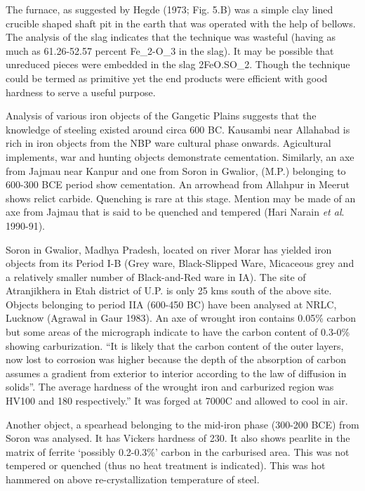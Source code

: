 The furnace, as suggested by Hegde (1973; Fig. 5.B) was a simple clay lined crucible shaped shaft pit in the earth that was operated with the help of bellows. The analysis of the slag indicates that the technique was wasteful (having as much as 61.26-52.57 percent Fe_2-O_3 in the slag). It may be possible that unreduced pieces were embedded in the slag 2FeO.SO_2. Though the technique could be termed as primitive yet the end products were efficient with good hardness to serve a useful purpose.

Analysis of various iron objects of the Gangetic Plains suggests that the knowledge of steeling existed around circa 600 BC. Kausambi near Allahabad is rich in iron objects from the NBP ware cultural phase onwards. Agicultural implements, war and hunting objects demonstrate cementation. Similarly, an axe from Jajmau near Kanpur and one from Soron in Gwalior, (M.P.) belonging to 600-300 BCE period show cementation. An arrowhead from Allahpur in Meerut shows relict carbide. Quenching is rare at this stage. Mention may be made of an axe from Jajmau that is said to be quenched and tempered (Hari Narain \textit{et al}. 1990-91).

Soron in Gwalior, Madhya Pradesh, located on river Morar has yielded iron objects from its Period I-B (Grey ware, Black-Slipped Ware, Micaceous grey and a relatively smaller number of Black-and-Red ware in IA). The site of Atranjikhera in Etah district of U.P. is only 25 kms south of the above site. Objects belonging to period IIA (600-450 BC) have been analysed at NRLC, Lucknow (Agrawal in Gaur 1983). An axe of wrought iron contains 0.05\% carbon but some areas of the micrograph indicate to have the carbon content of 0.3-0\% showing carburization. “It is likely that the carbon content of the outer layers, now lost to corrosion was higher because the depth of the absorption of carbon assumes a gradient from exterior to interior according to the law of diffusion in solids”. The average hardness of the wrought iron and carburized region was HV100 and 180 respectively.” It was forged at 7000C and allowed to cool in air.

Another object, a spearhead belonging to the mid-iron phase (300-200 BCE) from Soron was analysed. It has Vickers hardness of 230. It also shows pearlite in the matrix of ferrite ‘possibly 0.2-0.3\%’ carbon in the carburised area. This was not tempered or quenched (thus no heat treatment is indicated). This was hot hammered on above re-crystallization temperature of steel.


